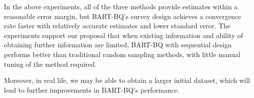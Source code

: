 In the above experiments, all of the three methods provide estimates within a reasonable error margin, but BART-BQ's survey design achieves a convergence rate faster with relatively accurate estimates and lower standard error. The experiments support our proposal that when existing information and ability of obtaining further information are limited, BART-BQ with sequential design performs better than traditional random sampling methods, with little manual tuning of the method required.

Moreover, in real life, we may be able to obtain a larger initial dataset, which will lead to further improvements in BART-BQ's performance.






